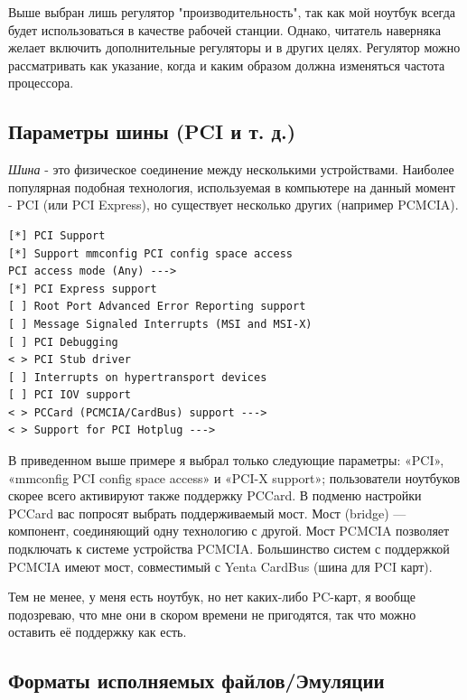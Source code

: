 \documentclass[10pt]{book}
\begin{document}
Выше выбран лишь регулятор "производительность", так как мой ноутбук всегда будет использоваться в качестве рабочей станции. Однако, читатель наверняка желает включить дополнительные регуляторы и в других целях. Регулятор можно рассматривать как указание, когда и каким образом должна изменяться частота процессора.

\subsection{Параметры шины (PCI и т. д.)}

\textit{Шина} - это физическое соединение между несколькими устройствами. Наиболее популярная подобная технология, используемая в компьютере на данный момент - PCI (или PCI Express), но существует несколько других (например PCMCIA).

\vspace{3mm}
\begin{tcolorbox}[colback=gray!14!white, colframe=blue!75!blue]
\begin{lstlisting}
[*] PCI Support
[*] Support mmconfig PCI config space access
PCI access mode (Any) --->
[*] PCI Express support
[ ] Root Port Advanced Error Reporting support
[ ] Message Signaled Interrupts (MSI and MSI-X)
[ ] PCI Debugging
< > PCI Stub driver
[ ] Interrupts on hypertransport devices
[ ] PCI IOV support
< > PCCard (PCMCIA/CardBus) support --->
< > Support for PCI Hotplug --->
\end{lstlisting}
\end{tcolorbox}

В приведенном выше примере я выбрал только следующие параметры: «PCI», «mmconfig PCI config space access» и «PCI-X support»; пользователи ноутбуков скорее всего активируют также поддержку PCCard. В подменю настройки PCCard вас попросят выбрать поддерживаемый мост. Мост (bridge) — компонент, соединяющий одну технологию с другой. Мост PCMCIA позволяет подключать к системе устройства PCMCIA. Большинство систем с поддержкой PCMCIA имеют мост, совместимый с Yenta CardBus (шина для PCI карт).

Тем не менее, у меня есть ноутбук, но нет каких-либо PC-карт, я вообще подозреваю, что мне они в скором времени не пригодятся, так что можно оставить её поддержку как есть.

\subsection{Форматы исполняемых файлов/Эмуляции}
\end{document}
